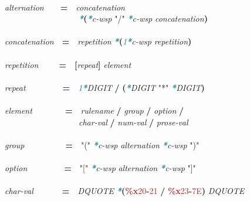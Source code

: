 \documentclass{article}
\begin{document}
{\\
\emph{alternation}\mbox{\ \ \ \ }\textbf{=}\mbox{\ \ }\emph{concatenation}\\
\mbox{\ \ \ \ \ \ \ \ \ \ \ \ \ \ \ \ \ \ }\textcolor{teal}{\emph{\textbf{*}}}\textbf{(}\textcolor{teal}{\emph{\textbf{*}}}\emph{c{-}wsp} \textcolor{BrickRed}{"/"} \textcolor{teal}{\emph{\textbf{*}}}\emph{c{-}wsp} \emph{concatenation}\textbf{)}\\
\\
\emph{concatenation}\mbox{\ \ }\textbf{=}\mbox{\ \ }\emph{repetition} \textcolor{teal}{\emph{\textbf{*}}}\textbf{(}\textcolor{teal}{\emph{1\textbf{*}}}\emph{c{-}wsp} \emph{repetition}\textbf{)}\\
\\
\emph{repetition}\mbox{\ \ \ \ \ }\textbf{=}\mbox{\ \ }\textbf{[}\emph{repeat}\textbf{]} \emph{element}\\
\\
\emph{repeat}\mbox{\ \ \ \ \ \ \ \ \ }\textbf{=}\mbox{\ \ }\textcolor{teal}{\emph{1\textbf{*}}}\emph{DIGIT} \textbf{/} \textbf{(}\textcolor{teal}{\emph{\textbf{*}}}\emph{DIGIT} \textcolor{BrickRed}{"*"} \textcolor{teal}{\emph{\textbf{*}}}\emph{DIGIT}\textbf{)}\\
\\
\emph{element}\mbox{\ \ \ \ \ \ \ \ }\textbf{=}\mbox{\ \ }\emph{rulename} \textbf{/} \emph{group} \textbf{/} \emph{option} \textbf{/}\\
\mbox{\ \ \ \ \ \ \ \ \ \ \ \ \ \ \ \ \ \ }\emph{char{-}val} \textbf{/} \emph{num{-}val} \textbf{/} \emph{prose{-}val}\\
\\
\emph{group}\mbox{\ \ \ \ \ \ \ \ \ \ }\textbf{=}\mbox{\ \ }\textcolor{BrickRed}{"("} \textcolor{teal}{\emph{\textbf{*}}}\emph{c{-}wsp} \emph{alternation} \textcolor{teal}{\emph{\textbf{*}}}\emph{c{-}wsp} \textcolor{BrickRed}{")"}\\
\\
\emph{option}\mbox{\ \ \ \ \ \ \ \ \ }\textbf{=}\mbox{\ \ }\textcolor{BrickRed}{"["} \textcolor{teal}{\emph{\textbf{*}}}\emph{c{-}wsp} \emph{alternation} \textcolor{teal}{\emph{\textbf{*}}}\emph{c{-}wsp} \textcolor{BrickRed}{"]"}\\
\\
\emph{char{-}val}\mbox{\ \ \ \ \ \ \ }\textbf{=}\mbox{\ \ }\emph{DQUOTE} \textcolor{teal}{\emph{\textbf{*}}}\textbf{(}\textcolor{Brown}{\textbf{\%{}x}20\textbf{-}21} \textbf{/} \textcolor{Brown}{\textbf{\%{}x}23\textbf{-}7E}\textbf{)} \emph{DQUOTE}\\
}
\end{document}
